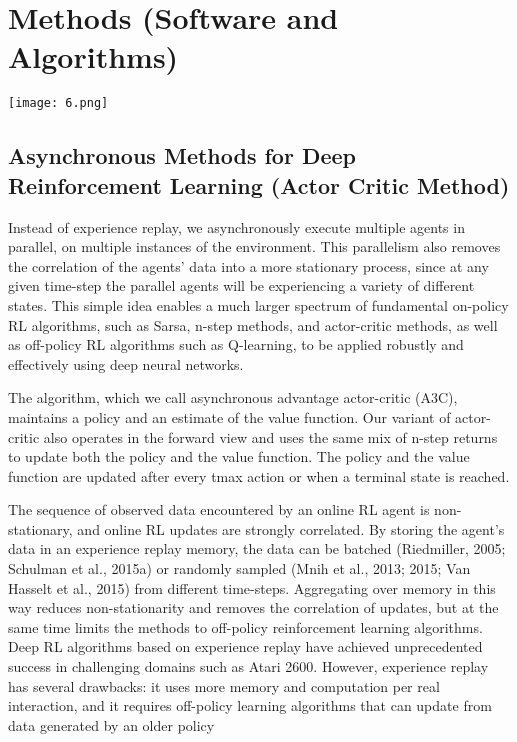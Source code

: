 \documentclass[conference]{IEEEtran}
\begin{document}
\section{Methods (Software and Algorithms)}

\begin{figure*}
  \texttt{[image: 6.png]}
\end{figure*}

\subsection{\textbf{Asynchronous Methods for Deep Reinforcement Learning (Actor Critic Method)}}

Instead of experience replay, we asynchronously execute multiple agents in parallel, on multiple instances of the environment. This parallelism also removes the correlation of the agents’ data into a more stationary process, since at any given time-step the parallel agents will be experiencing a variety of different states. This simple idea enables a much larger spectrum of fundamental on-policy RL algorithms, such as Sarsa, n-step methods, and actor-critic methods, as well as off-policy RL algorithms such as Q-learning, to be applied robustly and effectively using deep neural networks.

The algorithm, which we call asynchronous advantage actor-critic (A3C), maintains a policy and an estimate of the value function. Our variant of actor-critic also operates in the forward view and uses the same mix of n-step returns to update both the policy and the value function. The policy and the value function are updated after every tmax action or when a terminal state is reached.

The sequence of observed data encountered by an online RL agent is non-stationary, and online RL updates are strongly correlated. By storing the agent’s data in an experience replay memory, the data can be batched (Riedmiller, 2005; Schulman et al., 2015a) or randomly sampled (Mnih et al., 2013; 2015; Van Hasselt et al., 2015) from different time-steps. Aggregating over memory in this way reduces non-stationarity and removes the correlation of updates, but at the same time limits the methods to off-policy reinforcement learning algorithms. Deep RL algorithms based on experience replay have achieved unprecedented success in challenging domains such as Atari 2600. However, experience replay has several drawbacks: it uses more memory and computation per real interaction, and it requires off-policy learning algorithms that can update from data generated by an older policy
\end{document}
